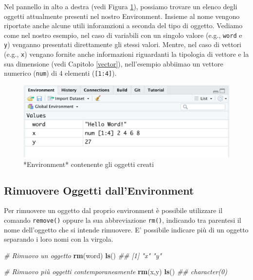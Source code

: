 \documentclass[
]{book}
\newenvironment{Shaded}{\begin{snugshade}}{\end{snugshade}}
\newcommand{\CommentTok}[1]{\textcolor[rgb]{0.56,0.35,0.01}{\textit{#1}}}
\newcommand{\KeywordTok}[1]{\textcolor[rgb]{0.13,0.29,0.53}{\textbf{#1}}}
\newcommand{\NormalTok}[1]{#1}
\begin{document}
Nel pannello in alto a destra (vedi Figura \ref{fig:environment-object}), possiamo trovare un elenco degli oggetti attualmente presenti nel nostro Environment. Insieme al nome vengono riportate anche alcune utili inforamzioni a seconda del tipo di oggetto. Vediamo come nel nostro esempio, nel caso di variabili con un singolo valore (e.g., \texttt{word} e \texttt{y}) venganno presentati direttamente gli stessi valori. Mentre, nel caso di vettori (e.g., \texttt{x}) vengano fornite anche informazioni riguardanti la tipologia di vettore e la sua dimensione (vedi Capitolo \ref{vector}), nell'esempio abbiimao un vettore numerico (\texttt{num}) di 4 elementi (\texttt{{[}1:4{]}}).

\begin{figure}

{\centering \includegraphics[width=0.6\linewidth]{images/environment-objects} 

}

\caption{*Environment* contenente gli oggetti creati}\label{fig:environment-object}
\end{figure}

\hypertarget{rimuovere-oggetti-dallenvironment}{%
\subsection{Rimuovere Oggetti dall'Environment}\label{rimuovere-oggetti-dallenvironment}}

Per rimuovere un oggetto dal proprio environment è possibile utilizzare il comando \texttt{remove()} oppure la sua abbreviazione \texttt{rm()}, indicando tra parentesi il nome dell'oggetto che si intende rimuovere. E' possibile indicare più di un oggetto separando i loro nomi con la virgola.

\begin{Shaded}
\begin{Highlighting}[]
\CommentTok{# Rimuovo un oggetto}
\KeywordTok{rm}\NormalTok{(word)}
\KeywordTok{ls}\NormalTok{()}
\CommentTok{## [1] "x" "y"}

\CommentTok{# Rimuovo più oggetti contemporaneamente}
\KeywordTok{rm}\NormalTok{(x,y)}
\KeywordTok{ls}\NormalTok{()}
\CommentTok{## character(0)}
\end{Highlighting}
\end{Shaded}
\end{document}
